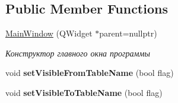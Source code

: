 \subsection*{Public Member Functions}
\begin{DoxyCompactItemize}
\item 
\hyperlink{classMainWindow_a996c5a2b6f77944776856f08ec30858d}{Main\+Window} (Q\+Widget $\ast$parent=nullptr)
\begin{DoxyCompactList}\small\item\em Конструктор главного окна программы \end{DoxyCompactList}\item 
void {\bfseries set\+Visible\+From\+Table\+Name} (bool flag)\hypertarget{classMainWindow_a42fd12fde514f164b342cea6d1cfa12e}{}\label{classMainWindow_a42fd12fde514f164b342cea6d1cfa12e}

\item 
void {\bfseries set\+Visible\+To\+Table\+Name} (bool flag)\hypertarget{classMainWindow_a898343a7d9131a68c2def020b76f3dd1}{}\label{classMainWindow_a898343a7d9131a68c2def020b76f3dd1}

\end{DoxyCompactItemize}

